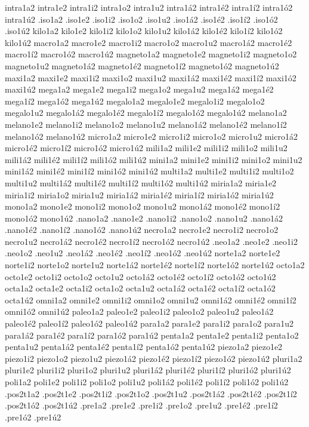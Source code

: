 {intra1a2 intra1e2 intra1i2 intra1o2 intra1u2 intra1á2 intra1é2 intra1í2 intra1ó2 intra1ú2 
.iso1a2 .iso1e2 .iso1i2 .iso1o2 .iso1u2 .iso1á2 .iso1é2 .iso1í2 .iso1ó2 .iso1ú2 
kilo1a2 kilo1e2 kilo1i2 kilo1o2 kilo1u2 kilo1á2 kilo1é2 kilo1í2 kilo1ó2 kilo1ú2 
macro1a2 macro1e2 macro1i2 macro1o2 macro1u2 macro1á2 macro1é2 macro1í2 macro1ó2 macro1ú2 
magneto1a2 magneto1e2 magneto1i2 magneto1o2 magneto1u2 magneto1á2 magneto1é2 magneto1í2 magneto1ó2 magneto1ú2 
maxi1a2 maxi1e2 maxi1i2 maxi1o2 maxi1u2 maxi1á2 maxi1é2 maxi1í2 maxi1ó2 maxi1ú2 
mega1a2 mega1e2 mega1i2 mega1o2 mega1u2 mega1á2 mega1é2 mega1í2 mega1ó2 mega1ú2 
megalo1a2 megalo1e2 megalo1i2 megalo1o2 megalo1u2 megalo1á2 megalo1é2 megalo1í2 megalo1ó2 megalo1ú2 
melano1a2 melano1e2 melano1i2 melano1o2 melano1u2 melano1á2 melano1é2 melano1í2 melano1ó2 melano1ú2 
micro1a2 micro1e2 micro1i2 micro1o2 micro1u2 micro1á2 micro1é2 micro1í2 micro1ó2 micro1ú2 
mili1a2 mili1e2 mili1i2 mili1o2 mili1u2 mili1á2 mili1é2 mili1í2 mili1ó2 mili1ú2 
mini1a2 mini1e2 mini1i2 mini1o2 mini1u2 mini1á2 mini1é2 mini1í2 mini1ó2 mini1ú2 
multi1a2 multi1e2 multi1i2 multi1o2 multi1u2 multi1á2 multi1é2 multi1í2 multi1ó2 multi1ú2 
miria1a2 miria1e2 miria1i2 miria1o2 miria1u2 miria1á2 miria1é2 miria1í2 miria1ó2 miria1ú2 
mono1a2 mono1e2 mono1i2 mono1o2 mono1u2 mono1á2 mono1é2 mono1í2 mono1ó2 mono1ú2 
.nano1a2 .nano1e2 .nano1i2 .nano1o2 .nano1u2 .nano1á2 .nano1é2 .nano1í2 .nano1ó2 .nano1ú2 
necro1a2 necro1e2 necro1i2 necro1o2 necro1u2 necro1á2 necro1é2 necro1í2 necro1ó2 necro1ú2 
.neo1a2 .neo1e2 .neo1i2 .neo1o2 .neo1u2 .neo1á2 .neo1é2 .neo1í2 .neo1ó2 .neo1ú2 
norte1a2 norte1e2 norte1i2 norte1o2 norte1u2 norte1á2 norte1é2 norte1í2 norte1ó2 norte1ú2 
octo1a2 octo1e2 octo1i2 octo1o2 octo1u2 octo1á2 octo1é2 octo1í2 octo1ó2 octo1ú2 
octa1a2 octa1e2 octa1i2 octa1o2 octa1u2 octa1á2 octa1é2 octa1í2 octa1ó2 octa1ú2 
omni1a2 omni1e2 omni1i2 omni1o2 omni1u2 omni1á2 omni1é2 omni1í2 omni1ó2 omni1ú2 
paleo1a2 paleo1e2 paleo1i2 paleo1o2 paleo1u2 paleo1á2 paleo1é2 paleo1í2 paleo1ó2 paleo1ú2 
para1a2 para1e2 para1i2 para1o2 para1u2 para1á2 para1é2 para1í2 para1ó2 para1ú2 
penta1a2 penta1e2 penta1i2 penta1o2 penta1u2 penta1á2 penta1é2 penta1í2 penta1ó2 penta1ú2 
piezo1a2 piezo1e2 piezo1i2 piezo1o2 piezo1u2 piezo1á2 piezo1é2 piezo1í2 piezo1ó2 piezo1ú2 
pluri1a2 pluri1e2 pluri1i2 pluri1o2 pluri1u2 pluri1á2 pluri1é2 pluri1í2 pluri1ó2 pluri1ú2 
poli1a2 poli1e2 poli1i2 poli1o2 poli1u2 poli1á2 poli1é2 poli1í2 poli1ó2 poli1ú2 
.pos2t1a2 .pos2t1e2 .pos2t1i2 .pos2t1o2 .pos2t1u2 .pos2t1á2 .pos2t1é2 .pos2t1í2 .pos2t1ó2 .pos2t1ú2 
.pre1a2 .pre1e2 .pre1i2 .pre1o2 .pre1u2          .pre1é2 .pre1í2 .pre1ó2 .pre1ú2 
}
